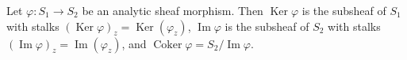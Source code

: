 Let $\varphi: S_1 \to S_2$ be an analytic sheaf morphism. Then $\operatorname{Ker} \varphi$ is the subsheaf of $S_1$ with stalks $(\operatorname{Ker} \varphi)_z = \operatorname{Ker}(\varphi_z)$, $\operatorname{Im} \varphi$ is the subsheaf of $S_2$ with stalks $(\operatorname{Im} \varphi)_z = \operatorname{Im}(\varphi_z)$, and $\operatorname{Coker} \varphi = S_2 / \operatorname{Im} \varphi$.
